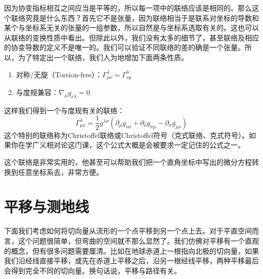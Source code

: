 \documentclass{ctexart}
\begin{document}
因为协变指标相互之间应当是平等的，所以每一项中的联络应该是相同的。那么这个联络究竟是什么东西？首先它不是张量，因为联络相当于是联系对坐标的导数和某个与坐标系无关的张量的一组参数，所以自然是与坐标系选取有关的。这也可以从联络的变换性质中看出。但除此以外，我们没有太多的细节了，甚至联络及相应的协变导数的定义不是唯一的。我们可以验证不同联络的差的确是一个张量。所以，为了特定出一个联络，我们人为地增加下面两条性质。
\begin{enumerate}
\item 对称/无旋（Torsion-free）：$\Gamma^\lambda_{\mu\nu}=\Gamma^\lambda_{\nu\mu}$
\item 与度规兼容：$\nabla_\mu g_{\nu\lambda}=0$
\end{enumerate}
这样我们得到一个与度规有关的联络：
\begin{equation}
\Gamma^\lambda_{\mu\nu}=\frac{1}{2}g^{\lambda\sigma}(\partial_\mu g_{\nu\sigma}+\partial_\nu g_{\sigma\mu}-\partial_\sigma g_{\mu\nu})
\end{equation}
这个特别的联络称为Christoffel联络或Christoffel符号（克式联络、克式符号）。如果你在学广义相对论这门课，这个公式大概是会被要求一定记住的公式之一。

这个联络是非常实用的，他甚至可以帮助我们把一个直角坐标中写出的微分方程转换到任意坐标系去，非常方便。

\section{平移与测地线}
下面我们考虑如何将切向量从流形的一个点平移到另一个点上去。对于平直空间而言，这个问题很简单，但弯曲的空间就不那么显然了。我们仿佛对平移有一个直观的概念，但有很多问题需要厘清。比如在地球赤道上一根指向北极的切向量，如果我们沿经线直接平移，或先在赤道上平移之后，沿另一根经线平移，两种平移最后会得到完全不同的切向量。换句话说，平移与路径有关。
\end{document}
